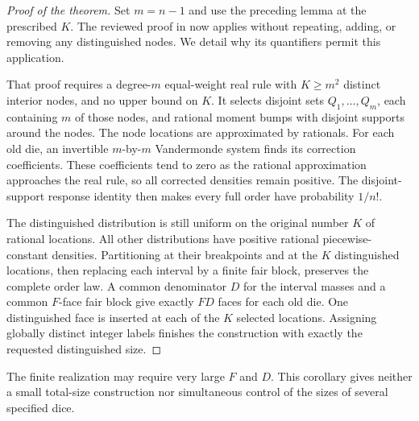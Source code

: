 \documentclass[11pt]{article}
\begin{document}
\begin{proof}[Proof of the theorem]
Set $m=n-1$ and use the preceding lemma at the prescribed $K$.
The reviewed proof in
 now applies
without repeating, adding, or removing any distinguished nodes.
We detail why its quantifiers permit this application.

That proof requires a degree-$m$ equal-weight real rule with
$K\ge m^2$ distinct interior nodes, and no upper bound on $K$.
It selects disjoint sets $Q_1,\ldots,Q_m$, each containing $m$ of
those nodes, and rational moment bumps with disjoint supports around
the nodes. The node locations are approximated by rationals.
For each old die, an invertible $m$-by-$m$ Vandermonde system finds
its correction coefficients. These coefficients tend to zero as
the rational approximation approaches the real rule, so all corrected
densities remain positive. The disjoint-support response identity
then makes every full order have probability $1/n!$.

The distinguished distribution is still uniform on the original
number $K$ of rational locations. All other distributions have
positive rational piecewise-constant densities. Partitioning at their
breakpoints and at the $K$ distinguished locations, then replacing
each interval by a finite fair block, preserves the complete order
law. A common denominator $D$ for the interval masses and a common
$F$-face fair block give exactly $FD$ faces for each old die.
One distinguished face is inserted at each of the $K$ selected
locations. Assigning globally distinct integer labels finishes the
construction with exactly the requested distinguished size.
\end{proof}

The finite realization may require very large $F$ and $D$. This
corollary gives neither a small total-size construction nor simultaneous
control of the sizes of several specified dice.
\end{document}
